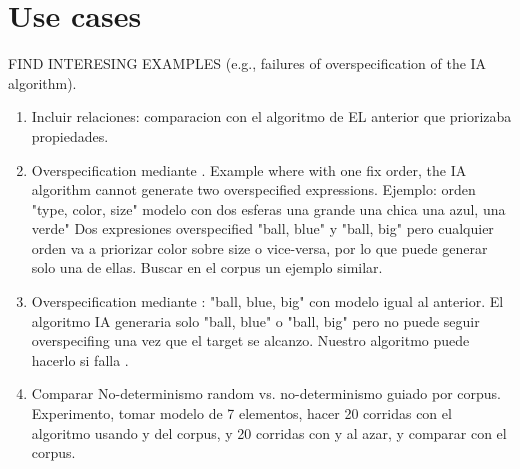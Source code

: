 \section{Use cases}\label{sec:usecases}


FIND INTERESING EXAMPLES (e.g., failures of overspecification of the IA algorithm). 

\begin{enumerate}

\item Incluir relaciones: comparacion con el algoritmo de EL anterior que priorizaba 
propiedades. 

\item Overspecification mediante \puse.  Example where with one fix order, the IA algorithm cannot generate two overspecified expressions. Ejemplo: orden "type, color, size" modelo con dos esferas una grande una chica una azul, una verde" Dos expresiones overspecified "ball, blue" y "ball, big" pero cualquier orden va a priorizar color sobre size o vice-versa, por lo que puede generar solo una de ellas.  Buscar en el corpus un ejemplo similar. 

\item Overspecification mediante \pdisc: "ball, blue, big" con modelo igual al anterior.  El algoritmo IA generaria solo "ball, blue" o "ball, big" pero no puede seguir overspecifing una vez que el target se alcanzo.  Nuestro algoritmo puede hacerlo si falla \pdisc. 

\item Comparar No-determinismo random vs. no-determinismo guiado por corpus.  Experimento, tomar modelo de 7 elementos, hacer 20 corridas con el algoritmo usando \pdisc y \puse del corpus, y 20 corridas con \pdisc y \puse al azar, y comparar con el corpus.  

\end{enumerate}

